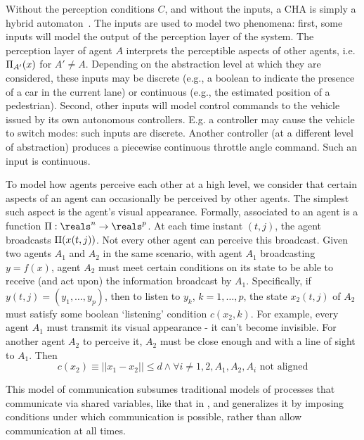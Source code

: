 Without the perception conditions $C$, and without the inputs, a CHA is simply a hybrid automaton~\cite{Henzinger96}.
The inputs are used to model two phenomena: 
first, some inputs will model the output of the perception layer of the system. 
The perception layer of agent $A$ interprets the perceptible aspects of other agents, i.e. $\Pi_{A'}(x)$ for $A'\neq A$.
Depending on the abstraction level at which they are considered, these inputs may be discrete (e.g., a boolean to indicate the presence of a car in the current lane) or continuous (e.g., the estimated position of a pedestrian).
Second, other inputs will model control commands to the vehicle issued by its own autonomous controllers. 
E.g. a controller may cause the vehicle to switch modes: such inputs are discrete. 
Another controller (at a different level of abstraction) produces a piecewise continuous throttle angle command. Such an input is continuous. 

To model how agents perceive each other at a high level, we consider that certain aspects of an agent can occasionally be perceived by other agents.
The simplest such aspect is the agent's visual appearance.
Formally, associated to an agent is a function $\funcOut:\reals^n \rightarrow \reals^p$.
At each time instant $(t,j)$, the agent broadcasts $\Pi(x(t,j))$.
Not every other agent can perceive this broadcast.
Given two agents $A_1$ and $A_2$ in the same scenario, with agent $A_1$ broadcasting $y = f(x)$, agent $A_2$ must meet certain conditions on its state to be able to receive (and act upon) the information broadcast by $A_1$.
Specifically, if $y(t,j) = (y_1,\ldots,y_p)$, then to listen to $y_k$, $k=1,\ldots,p$, the state $x_2(t,j)$ of $A_2$ must satisfy some boolean `listening' condition $c(x_2,k)$.
For example, every agent $A_1$ must transmit its visual appearance - it can't become invisible.
For another agent $A_2$ to perceive it, $A_2$ must be close enough and with a line of sight to $A_1$. 
Then 
\[c(x_2) \equiv ||x_1 - x_2 || \leq d \land \forall i\neq 1,2, A_1,A_2,A_i \text{ not aligned}\]

This model of communication subsumes traditional models of processes that communicate via shared variables, like that in , and generalizes it by imposing conditions under which communication is possible, rather than allow communication at all times.

